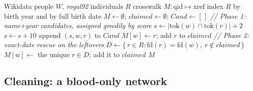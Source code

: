 \begin{algorithm}[H]
\caption{Two-phase entity resolution (Wikidata $\to$ \emph{royal92}).
$\mathrm{yr}$/$\mathrm{fd}$ are birth year / full birth date; $\mathrm{first}$
and $\mathrm{tok}$ are the normalized first-given-name token and token set.}
\label{alg:er}
\begin{algorithmic}[1]
\Require Wikidata people $W$, \emph{royal92} individuals $R$
\Ensure crosswalk $M:\text{qid}\mapsto\text{xref}$
\State index $R$ by birth year and by full birth date
\State $M\gets\emptyset$;\; $\mathit{claimed}\gets\emptyset$;\; $\mathit{Cand}\gets[\,]$
\Statex \textit{\small// Phase 1: name+year candidates, assigned greedily by score}
      \State $s\gets|\mathrm{tok}(w)\cap\mathrm{tok}(r)|+2$
       $s\gets s+10$ \EndIf
      \State append $(s,w,r)$ to $\mathit{Cand}$
    \EndIf
  \EndFor
\EndFor
{}
    \State $M[w]\gets r$;\; add $r$ to $\mathit{claimed}$
  \EndIf
\EndFor
\Statex \textit{\small// Phase 2: exact-date rescue on the leftovers}
  \State $D\gets\{\,r\in R:\mathrm{fd}(r)=\mathrm{fd}(w),\ r\notin\mathit{claimed}\,\}$
    \State $M[w]\gets$ the unique $r\in D$;\; add it to $\mathit{claimed}$
  \EndIf
\EndFor
\State \Return $M$
\end{algorithmic}
\end{algorithm}

\subsection{Cleaning: a blood-only network}
\label{sub:cleaning}

